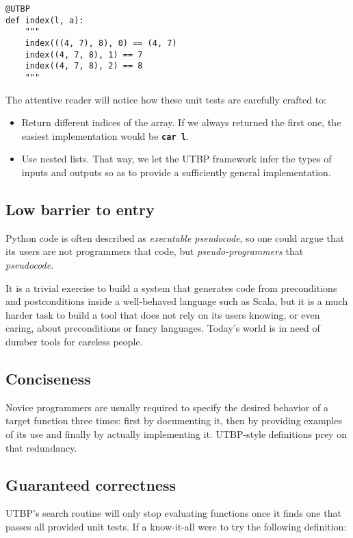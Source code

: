 \documentclass[12pt,twocolumn]{article}
\begin{document}
\begin{verbatim}
@UTBP
def index(l, a):
    """
    index(((4, 7), 8), 0) == (4, 7)
    index((4, 7, 8), 1) == 7
    index((4, 7, 8), 2) == 8
    """
\end{verbatim}

The attentive reader will notice how these unit tests are carefully crafted to:
\begin{itemize}
    \item Return different indices of the array. If we always returned the first one, the easiest implementation would be \texttt{\textbf{car l}}.
    \item Use nested lists. That way, we let the UTBP framework infer the types of inputs and outputs so as to provide a sufficiently general implementation.
\end{itemize}

\subsection{Low barrier to entry}
Python code is often described as \emph{executable pseudocode}, so one could argue that its users are not programmers that code, but \emph{pseudo-programmers} that \emph{pseudocode}. 

It is a trivial exercise to build a system that generates code from preconditions and postconditions inside a well-behaved language such as Scala\cite{Kneuss2013}, but it is a much harder task to build a tool that does not rely on its users knowing, or even caring, about preconditions or fancy languages. Today's world is in need of dumber tools for careless people.

\subsection{Conciseness}
Novice programmers are usually required to specify the desired behavior of a target function three times: first by documenting it, then by providing examples of its use and finally by actually implementing it. UTBP-style definitions prey on that redundancy.

\subsection{Guaranteed correctness}
UTBP's search routine will only stop evaluating functions once it finds one that passes all provided unit tests. If a know-it-all were to try the following definition:
\end{document}
